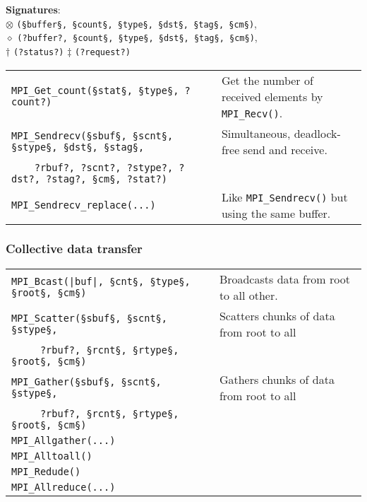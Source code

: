 \documentclass[11pt]{article}
\begin{document}
\textbf{Signatures}: \\
{ \footnotesize
	\hspace{2cm} $\otimes$ \lstinline$(§buffer§, §count§, §type§, §dst§, §tag§, §cm§)$, \\
	\hspace{2cm} $\diamond$ \lstinline$(?buffer?, §count§, §type§, §dst§, §tag§, §cm§)$, \\
	\hspace{2cm} $\dag$ \lstinline$(?status?)$ $\ddag$ \lstinline$(?request?)$
}

\begin{tabular}{ p{8cm} l }
	\lstinline$MPI_Get_count(§stat§, §type§, ?count?)$ & Get the number of received elements by \lstinline$MPI_Recv()$. \\

	\lstinline$MPI_Sendrecv(§sbuf§, §scnt§, §stype§, §dst§, §stag§,$ & Simultaneous, deadlock-free send and receive. \\
	\lstinline$    ?rbuf?, ?scnt?, ?stype?, ?dst?, ?stag?, §cm§, ?stat?)$ & \\

	\lstinline$MPI_Sendrecv_replace(...)$ & Like \lstinline$MPI_Sendrecv()$ but using the same buffer. \\
\end{tabular}

\subsubsection{Collective data transfer}

\begin{tabular}{ p{8cm} l }
	\lstinline$MPI_Bcast(|buf|, §cnt§, §type§, §root§, §cm§)$ & Broadcasts data from root to all other. \\
		\lstinline$MPI_Scatter(§sbuf§, §scnt§, §stype§,$ & Scatters chunks of data from root to all \\
	\lstinline$     ?rbuf?, §rcnt§, §rtype§, §root§, §cm§)$ & \\
	\lstinline$MPI_Gather(§sbuf§, §scnt§, §stype§,$ & Gathers chunks of data from root to all \\
	\lstinline$     ?rbuf?, §rcnt§, §rtype§, §root§, §cm§)$ & \\
	\lstinline$MPI_Allgather(...)$ & \\
	\lstinline$MPI_Alltoall()$ & \\
	\lstinline$MPI_Redude()$ & \\
	\lstinline$MPI_Allreduce(...)$ & \\
\end{tabular}
\end{document}
